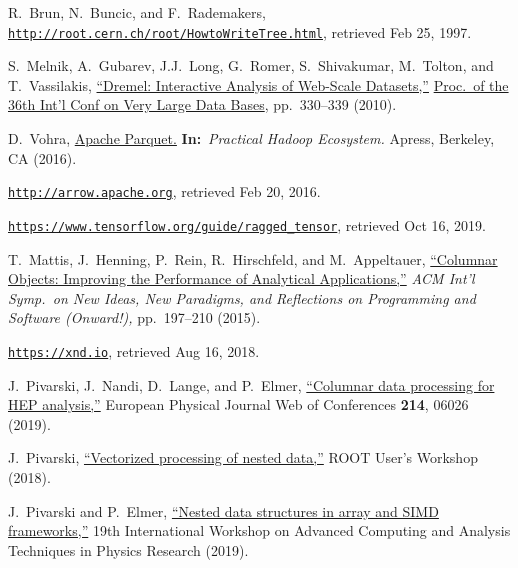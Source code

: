 \documentclass{webofc}
\begin{document}
\begin{thebibliography}{}

R.\ Brun, N.\ Buncic, and F.\ Rademakers, \\ \href{https://web.archive.org/web/19970225083621/http://root.cern.ch/root/HowtoWriteTree.html}{\tt http://root.cern.ch/root/HowtoWriteTree.html}, retrieved Feb 25, 1997.

S.\ Melnik, A.\ Gubarev, J.J.\ Long, G.\ Romer, S.\ Shivakumar, M.\ Tolton, and T.\ Vassilakis, \href{https://ai.google/research/pubs/pub36632}{``Dremel: Interactive Analysis of Web-Scale Datasets,''} \href{http://www.vldb2010.org/accept.htm}{Proc.\ of the 36th Int'l Conf on Very Large Data Bases}, pp.\ 330--339 (2010).

D.\ Vohra, \href{https://doi.org/10.1007/978-1-4842-2199-0_8}{Apache Parquet.} {\bf In:}\ {\it Practical Hadoop Ecosystem.} Apress, Berkeley, CA (2016).

\href{https://web.archive.org/web/20160220113406/http://arrow.apache.org/}{\tt http://arrow.apache.org}, retrieved Feb 20, 2016.

\href{https://web.archive.org/web/20191016194209/https://www.tensorflow.org/guide/ragged_tensor}{\tt https://www.tensorflow.org/guide/ragged\_tensor}, retrieved Oct 16, 2019.

T.\ Mattis, J.\ Henning, P.\ Rein, R.\ Hirschfeld, and M.\ Appeltauer, \href{https://dl.acm.org/citation.cfm?id=2814228.2814230}{``Columnar Objects: Improving the Performance of Analytical Applications,''} {\it ACM Int'l Symp.\ on New Ideas, New Paradigms, and Reflections on Programming and Software (Onward!),} pp.\ 197--210 (2015).

\href{https://web.archive.org/web/20180816220247/https://xnd.io/}{\tt https://xnd.io}, retrieved Aug 16, 2018.

J.\ Pivarski, J.\ Nandi, D.\ Lange, and P.\ Elmer, \href{https://doi.org/10.1051/epjconf/201921406026}{``Columnar data processing for HEP analysis,''} European Physical Journal Web of Conferences \textbf{214}, 06026 (2019).

J.\ Pivarski, \href{https://indico.cern.ch/event/697389/contributions/3102772/}{``Vectorized processing of nested data,''} ROOT User's Workshop (2018).

J.\ Pivarski and P.\ Elmer, \href{https://indico.cern.ch/event/708041/contributions/3276200/}{``Nested data structures in array and SIMD frameworks,''} 19th International Workshop on Advanced Computing and Analysis Techniques in Physics Research (2019).


\end{thebibliography}
\end{document}
